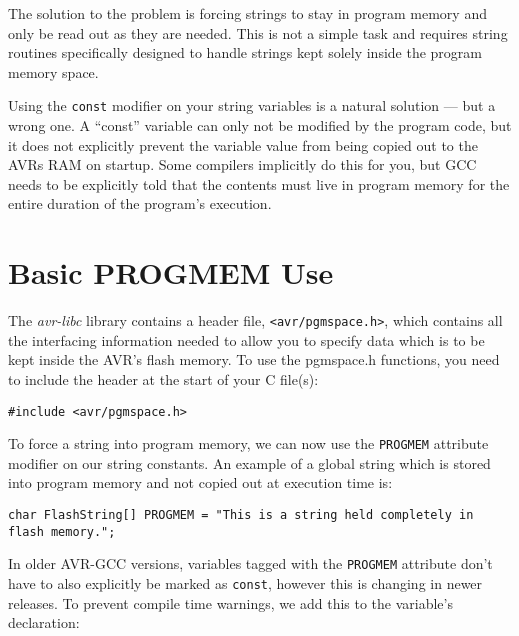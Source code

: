 \documentclass[a4paper,oneside,notitlepage]{book}
\begin{document}
The solution to the problem is forcing strings to stay in program memory and only be read out as they are needed. This is not a simple task and requires string routines specifically designed to handle strings kept solely inside the program memory space.

Using the \lstinline{const} modifier on your string variables is a natural solution --- but a wrong one. A ``const'' variable can only not be modified by the program code, but it does not explicitly prevent the variable value from being copied out to the AVRs RAM on startup. Some compilers implicitly do this for you, but GCC needs to be explicitly told that the contents must live in program memory for the entire duration of the program's execution.

\label{chp:pgmspace}
\chapter{Basic PROGMEM Use}

The \textit{avr-libc} library contains a header file, \lstinline{<avr/pgmspace.h>}, which contains all the interfacing information needed to allow you to specify data which is to be kept inside the AVR's flash memory. To use the pgmspace.h functions, you need to include the header at the start of your C file(s):

\begin{center}
\begin{lstlisting}
#include <avr/pgmspace.h>
\end{lstlisting}
\end{center}

To force a string into program memory, we can now use the \lstinline{PROGMEM} attribute modifier on our string constants. An example of a global string which is stored into program memory and not copied out at execution time is:

\begin{center}
\begin{lstlisting}
char FlashString[] PROGMEM = "This is a string held completely in flash memory.";
\end{lstlisting}
\end{center}

In older AVR-GCC versions, variables tagged with the \lstinline{PROGMEM} attribute don't have to also explicitly be marked as \lstinline{const}, however this is changing in newer releases. To prevent compile time warnings, we add this to the variable's declaration:
\end{document}
